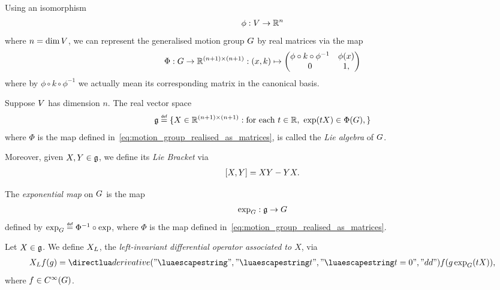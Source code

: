 Using an isomorphism
\begin{align}
    \phi : V \to \mathbb{R}^n
\end{align}
where $n = \dim V$,
we can represent the generalised motion group $G$
by real matrices via the map
\begin{align}
    \Phi : G \to \mathbb{R}^{(n + 1) \times (n + 1)} :
        (x, k) \mapsto
            \begin{pmatrix}
                \phi \circ k \circ \phi^{-1} & \phi(x)\\
                0 & 1,
            \end{pmatrix}
    \label{eq:motion_group_realised_as_matrices}
\end{align}
where by $\phi \circ k \circ \phi^{-1}$ we actually mean its corresponding matrix in the canonical basis.

\begin{definition}
\label{definition:Lie_Algebra}
    Suppose $V$ has dimension $n$.
    The real vector space
    \begin{align*}
        \LieAlgebra \defeq
            \{
                X \in \R^{(n + 1) \times (n + 1)} :
                \text{for each}\
                t \in \R,\
                \exp(t X) \in \Phi(\Group),
            \}
    \end{align*}
    where $\Phi$ is the map defined in~\eqref{eq:motion_group_realised_as_matrices},
    is called the \emph{Lie algebra} of $G$.

    Moreover, given $X, Y \in \mathfrak{g}$, we define its \emph{Lie Bracket} via
    \begin{align*}
        [X, Y] = X Y - Y X.
    \end{align*}
\end{definition}

\begin{definition}
\label{definition:exponential_map}
    The \emph{exponential map} on $G$ is the map
    \begin{align*}
        \exp_G : \mathfrak{g} \to G
    \end{align*}
    defined by $\exp_\Group \defeq \Phi^{-1} \circ \exp$,
    where $\Phi$ is the map defined in~\eqref{eq:motion_group_realised_as_matrices}.
\end{definition}

\begin{definition}
\label{definition:left-invariant_differential_operator}
    Let $X \in \mathfrak{g}$.
    We define ${X}_L$, the \emph{left-invariant differential operator associated to $X$}, via
    \begin{align*}
        \LeftDifferentialOperatorFirstOrder{X} f(g)
            = \D*{t}<t = 0> f(g \exp_\Group(t X)),
    \end{align*}
    where $f \in {C^\infty(G)}$.
\end{definition}

